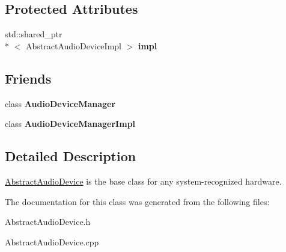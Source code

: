 \subsection*{Protected Attributes}
\begin{DoxyCompactItemize}
\item 
\hypertarget{class_audio_d_x_1_1_abstract_audio_device_ae221dbe42940057a92ae0854f97d58d4}{std\-::shared\-\_\-ptr\\*
$<$ Abstract\-Audio\-Device\-Impl $>$ {\bfseries impl}}\label{class_audio_d_x_1_1_abstract_audio_device_ae221dbe42940057a92ae0854f97d58d4}

\end{DoxyCompactItemize}
\subsection*{Friends}
\begin{DoxyCompactItemize}
\item 
\hypertarget{class_audio_d_x_1_1_abstract_audio_device_aa3d09594a601dd4ef0a0bdd1c6ddd73c}{class {\bfseries Audio\-Device\-Manager}}\label{class_audio_d_x_1_1_abstract_audio_device_aa3d09594a601dd4ef0a0bdd1c6ddd73c}

\item 
\hypertarget{class_audio_d_x_1_1_abstract_audio_device_a04f96566766f09f439a3a13c5fcbe408}{class {\bfseries Audio\-Device\-Manager\-Impl}}\label{class_audio_d_x_1_1_abstract_audio_device_a04f96566766f09f439a3a13c5fcbe408}

\end{DoxyCompactItemize}


\subsection{Detailed Description}
\hyperlink{class_audio_d_x_1_1_abstract_audio_device}{Abstract\-Audio\-Device} is the base class for any system-\/recognized hardware. 

The documentation for this class was generated from the following files\-:\begin{DoxyCompactItemize}
\item 
Abstract\-Audio\-Device.\-h\item 
Abstract\-Audio\-Device.\-cpp\end{DoxyCompactItemize}
